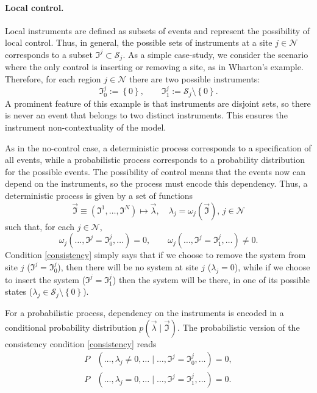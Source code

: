 \documentclass[a4paper,onecolumn,11pt,accepted=2018-05-04]{quantumarticle}
\begin{document}
\paragraph*{Local control.}
Local instruments are defined as subsets of events and represent the possibility of local control. Thus, in general, the possible sets of instruments at a site $j\in\mathcal{N}$ corresponds to a subset $\mathfrak{I}^j\subset \mathcal{S}_j$.
As a simple case-study, we consider the scenario where the only control is inserting or removing a site, as in Wharton's example. Therefore, for each region $j\in\mathcal{N}$ there are two possible instruments:
\begin{equation}
\mathfrak{I}^j_0:=\left\{0\right\},\qquad \mathfrak{I}^j_1:=\mathcal{S}_{j}{\setminus\left\{0\right\}}.
\label{instruments}
\end{equation}
A prominent feature of this example is that instruments are disjoint sets, so there is never an event that belongs to two distinct instruments. This ensures the instrument non-contextuality of the model.

As in the no-control case, a deterministic process corresponds to a specification of all events, while a probabilistic process corresponds to a probability distribution for the possible events. The possibility of control means that the events now can depend on the instruments, so the process must encode this dependency. Thus, a deterministic process is given by a set of functions
\begin{equation}
\vec{\mathfrak{I}}\equiv\left(\mathfrak{I}^1,\dots,\mathfrak{I}^N\right)\mapsto \vec{\lambda},\quad \lambda_j=\omega_j(\vec{\mathfrak{I}}),\,j\in\mathcal{N}
\label{detprocess}
\end{equation}
such that, for each $j\in\mathcal{N}$, 
\begin{equation}
\omega_j\left(\dots, \mathfrak{I}^j=\mathfrak{I}^j_0,\dots\right)=0,\qquad \omega_j\left(\dots, \mathfrak{I}^j=\mathfrak{I}^j_1,\dots\right)\neq 0.
\label{consistency}
\end{equation}
Condition \eqref{consistency} simply says that if we choose to remove the system from site $j$ ($\mathfrak{I}^j=\mathfrak{I}^j_0$), then there will be no system at site $j$ ($\lambda_j=0$), while if we choose to insert the system ($\mathfrak{I}^j=\mathfrak{I}^j_1$) then the system will be there, in one of its possible states ($\lambda_j\in \mathcal{S}_{j}{\setminus\left\{0\right\}}$).

For a probabilistic process, dependency on the instruments is encoded in a conditional probability distribution $p(\vec{\lambda}\mid \vec{\mathfrak{I}})$. The probabilistic version of the consistency condition \eqref{consistency} reads
\begin{align}\label{probconsistency}
P&\left(\dots, \lambda_j\neq 0,\ldots \mid \dots, \mathfrak{I}^j=\mathfrak{I}^j_0,\dots\right)=0,\\ \nonumber
P&\left(\dots, \lambda_j = 0,\ldots \mid \dots, \mathfrak{I}^j=\mathfrak{I}^j_1,\dots\right)=0.
\end{align}
\end{document}
